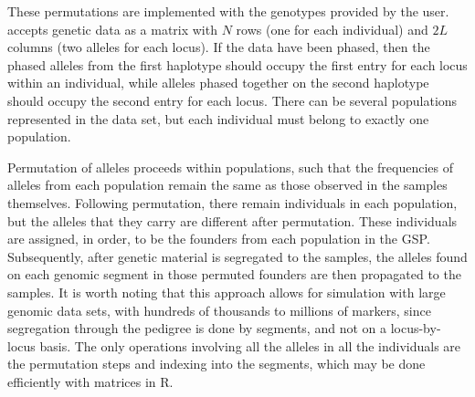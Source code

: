 These permutations are implemented with the genotypes provided by the user.
\gscramble{} accepts genetic data as a matrix with $N$ rows (one for each individual) and
$2L$ columns (two alleles for each locus). If the data have been phased, then the phased alleles from the
first haplotype should occupy the
first entry for each locus within an individual, while alleles phased together on the second haplotype should occupy the
second entry for each locus.
There can be several populations represented in the data set, but
each individual must belong to exactly one
population.

Permutation of alleles proceeds within populations, such that
the frequencies of alleles from each population remain the same as those observed
in the samples themselves. Following permutation, there remain individuals
in each population, but the alleles that they carry are different after permutation.  These
individuals are assigned, in order, to be the founders from each population in the GSP. Subsequently,
after genetic material is segregated to the samples, the alleles found on each genomic segment in those permuted
founders are then propagated to the samples.  It is worth noting that this approach allows for simulation
with large genomic data sets, with hundreds of thousands to millions of markers, since segregation
through the pedigree is done by segments, and not on a locus-by-locus basis. The only operations
involving all the alleles in all the individuals are the permutation steps and indexing into the segments,
which may be done efficiently with matrices in R.

